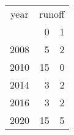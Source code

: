 \footnotesize\begin{tabular}[t]{lrr}
\toprule
\multicolumn{1}{c}{year} & \multicolumn{2}{c}{runoff} \\
\cmidrule(l{3pt}r{3pt}){1-1} \cmidrule(l{3pt}r{3pt}){2-3}
  & 0 & 1\\
\midrule
2008 & 5 & 2\\
2010 & 15 & 0\\
2014 & 3 & 2\\
2016 & 3 & 2\\
2020 & 15 & 5\\
\bottomrule
\end{tabular}
